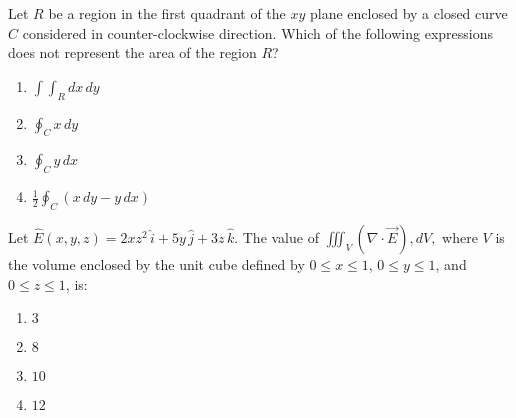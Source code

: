 \item Let $R$ be a region in the first quadrant of the $xy$ plane enclosed by a closed curve $C$ considered in counter-clockwise direction. Which of the following expressions does not represent the area of the region $R$?
\begin{figure}[!ht]
\centering
{}%

\label{fig:my_label}
\end{figure}
\begin{enumerate}
    \item $\int\!\!\!\int_R dx \, dy$
    \item $\oint_C x \, dy$
    \item $\oint_C y \, dx$
    \item $\frac{1}{2} \oint_C (x \, dy - y \, dx)$
\end{enumerate}

\item  Let $\hat{E}(x, y, z) = 2x z^2 \, \hat{i} + 5y \, \hat{j} + 3z \, \hat{k}$. The value of 
$\iiint_V (\nabla \cdot \overrightarrow{E}) , dV,$
where $V$ is the volume enclosed by the unit cube defined by $0 \leq x \leq 1$, $0 \leq y \leq 1$, and $0 \leq z \leq 1$, is:
\begin{enumerate}
    \item $3$
    \item $8$
    \item $10$
    \item $12$
\end{enumerate}

    


